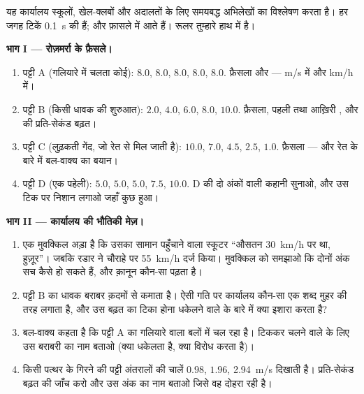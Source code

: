 \begin{problem}\label{pb:g9:uniform-varied-motion:1}
यह कार्यालय स्कूलों, खेल-क्लबों और अदालतों के लिए समयबद्ध अभिलेखों का
विश्लेषण करता है। हर जगह टिकें \qty{0.1}{s} की हैं; और फ़ासले
 में आते हैं। रूलर तुम्हारे हाथ में है।

\medskip\noindent\textbf{भाग I --- रोज़मर्रा के फ़ैसले।}
\begin{enumerate}
  \item पट्टी A (गलियारे में चलता कोई): $8.0$, $8.0$, $8.0$, $8.0$,
        $8.0$. फ़ैसला और  --- \unit{m/s} में और \unit{km/h} में।
  \item पट्टी B (किसी धावक की शुरुआत): $2.0$, $4.0$, $6.0$, $8.0$,
        $10.0$. फ़ैसला, पहली तथा आख़िरी , और  की प्रति-सेकंड
        बढ़त।
  \item पट्टी C (लुढ़कती गेंद, जो रेत से मिल जाती है): $10.0$, $7.0$,
        $4.5$, $2.5$, $1.0$. फ़ैसला --- और रेत के बारे में बल-वाक्य
        का बयान।
  \item पट्टी D (एक पहेली): $5.0$, $5.0$, $5.0$, $7.5$, $10.0$. D की
        दो अंकों वाली कहानी सुनाओ, और उस टिक पर निशान लगाओ जहाँ कुछ
        हुआ।
\end{enumerate}

\medskip\noindent\textbf{भाग II --- कार्यालय की भौतिकी मेज़।}
\begin{enumerate}[resume]
  \item एक मुवक्किल अड़ा है कि उसका सामान पहुँचाने वाला स्कूटर
        ``औसतन \qty{30}{km/h} पर था, हुज़ूर''। जबकि रडार ने चौराहे पर
        \qty{55}{km/h} दर्ज किया। मुवक्किल को समझाओ कि दोनों अंक सच
        कैसे हो सकते हैं, और क़ानून कौन-सा पढ़ता है।
  \item पट्टी B का धावक  बराबर क़दमों से कमाता है। ऐसी गति पर
        कार्यालय कौन-सा एक शब्द मुहर की तरह लगाता है, और उस बढ़त का
        टिका होना धकेलने वाले  के बारे में क्या इशारा करता है?
  \item बल-वाक्य कहता है कि पट्टी A का गलियारे वाला  बलों में
        चल रहा है। टिककर चलने वाले के लिए उस बराबरी का नाम बताओ (क्या
        धकेलता है, क्या विरोध करता है)।
  \item किसी पत्थर के गिरने की पट्टी अंतरालों की चालें $0.98$,
        $1.96$, \qty{2.94}{m/s} दिखाती है। प्रति-सेकंड बढ़त की जाँच
        करो और उस अंक का नाम बताओ जिसे वह दोहरा रही है।
\end{enumerate}


\end{problem}
